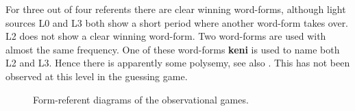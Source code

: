 For three out of four referents there are clear winning word-forms, although light sources L0 and L3 both show a short period where another word-form takes over. L2 does not show a clear winning word-form. Two word-forms are used with almost the same frequency. One of these word-forms {\bf keni} is used to name both L2 and L3. Hence there is apparently some polysemy, see also . This has not been observed at this level in the guessing game.

\begin{figure}[t]
\centering
{}
\caption{Form-referent diagrams of the observational games.}
\label{f:opt:froli}
\end{figure}


